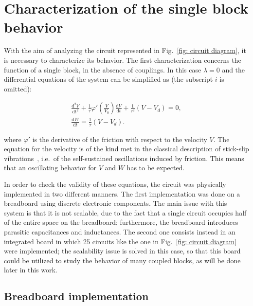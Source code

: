 \section{Characterization of the single block behavior}\label{sec: single block characterization}

With the aim of analyzing the circuit represented in Fig.~\ref{fig: circuit diagram},
it is necessary to characterize its behavior. The first characterization concerns the
function of a single block, in the absence of couplings.
In this case $\lambda=0$ and the differential equations of the system can be simplified as
(the subscript $i$ is omitted):

\begin{equation}
\label{eq: single block eq motion}
\begin{gathered}
    \frac{\text{d}^2V}{\text{d}t^2}+
    \frac{1}{\tau}\varphi'\left(\frac{V}{V_0}\right)\frac{\text{d}V}{\text{d}t}+
    \frac{1}{\tau^2}(V-V_d)=0,\\[10pt]
    \frac{\text{d}W}{\text{d}t}=\frac{1}{\tau}(V-V_d).
\end{gathered}
\end{equation}

where $\varphi'$ is the derivative of the friction with respect to the velocity $V$.
The equation for the velocity is of the kind met in the classical description of stick-slip
vibrations~\cite{ref:stick_slip}, i.e.\ of the self-sustained oscillations induced by friction.
This means that an oscillating behavior for $V$ and $W$ has to be expected.

In order to check the validity of these equations, the circuit was physically implemented
in two different manners. The first implementation was done on a breadboard using discrete
electronic components. The main issue with this system is that it is not scalable,
due to the fact that a single circuit occupies half of the entire space on the breadboard;
furthermore, the breadboard introduces parasitic capacitances and inductances.
The second one consists instead in an integrated board in which 25 circuits
like the one in Fig.~\ref{fig: circuit diagram} were implemented;
the scalability issue is solved in this case, so that this board could be utilized
to study the behavior of many coupled blocks, as will be done later in this work.

\subsection{Breadboard implementation}\label{subsec:breadboard implementation}

